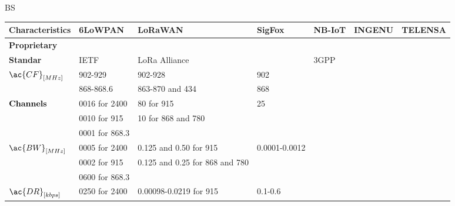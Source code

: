 \ac{BS}


\begin{table}[!ht]
\scriptsize
	\begin{tabulary}{\textwidth}{L|L|L|L|L|L|L}
	\bf{Characteristics}               & \bf{6LoWPAN}   & \bf{LoRaWAN}                    & \bf{SigFox}   & \bf{NB-IoT} & \textbf{INGENU} & \textbf{TELENSA}\\\hline
	\bf{Proprietary}                   &                &                                 & \ok           &             &                 &                 \\\hline
	\bf{Standar}                       & IETF           & LoRa Alliance                   &               & 3GPP        &                 &                 \\\hline
	 & 902-929        & 902-928                         & 902           &             &                 &                 \\
	\                                  & 868-868.6      & 863-870 and 434                 & 868           &             &                 &                 \\\hline
	  & 0016 for 2400  & 80             for 915          & 25            &             &                 &                 \\
	\                                  & 0010 for 915   & 10             for 868 and 780  &               &             &                 &                 \\
	\                                  & 0001 for 868.3 &                                 &               &             &                 &                 \\\hline
	 & 0005 for 2400  & 0.125 and 0.50 for 915          & 0.0001-0.0012 &             &                 &                 \\
	\                                  & 0002 for 915   & 0.125 and 0.25 for 868 and 780  &               &             &                 &                 \\
	\                                  & 0600 for 868.3 &                                 &               &             &                 &                 \\\hline
	& 0250 for 2400  & 0.00098-0.0219 for 915          & 0.1-0.6       &             &                 &                 \\

\end{tabulary}
\end{table}

